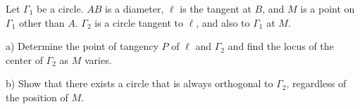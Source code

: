 Let $\Gamma_{1}$ be a circle. $AB$ is a diameter, $\ell$ is the tangent at $B$,  and $M$ is a point on $\Gamma_{1}$ other than $A$. $\Gamma_{2}$ is a circle tangent to $\ell$,  and also to $\Gamma_{1}$ at $M$.

a) Determine the point of tangency $P$ of $\ell$ and $\Gamma_{2}$ and find the locus of the center of $\Gamma_{2}$ as $M$ varies.

b) Show that there exists a circle that is always orthogonal to $\Gamma_{2}$,  regardless of the position of $M$.